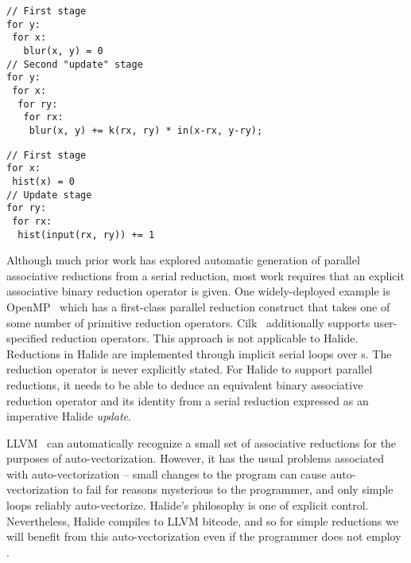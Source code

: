 \begin{lstlisting}[float, frame=t, caption={Pseudocode for convolution. This algorithm reduces over \code{rx} and \code{ry} and is data-parallel over \code{x} and \code{y}. In the Halide source, \code{rx} and \code{ry} would be \code{RVar}s in a two-dimensional \code{RDom}. \code{x} and \code{y} would be \code{Var}s.}, label={lst:blur_loopness}]
// First stage
for y:
 for x:
   blur(x, y) = 0
// Second "update" stage
for y:
 for x:
  for ry:
   for rx:
    blur(x, y) += k(rx, ry) * in(x-rx, y-ry);
\end{lstlisting}
\begin{lstlisting}[float, frame=t, caption={Computing the histogram of an image is hard to parallelize in Halide, since its update stage would be expressed with serial \code{RVar}s.}, label={lst:histogram_loopness}]
// First stage
for x:
 hist(x) = 0
// Update stage
for ry:
 for rx:
  hist(input(rx, ry)) += 1
\end{lstlisting}

Although much prior work has explored automatic generation of parallel associative reductions from a serial reduction, most work requires that an explicit associative binary reduction operator is given. One widely-deployed example is OpenMP~\cite{Dagum:1998:OIA:615255.615542} which has a first-class parallel reduction construct that takes one of some number of primitive reduction operators. Cilk~\cite{Blumofe:1995:CEM:209936.209958} additionally supports user-specified reduction operators. This approach is not applicable to Halide. Reductions in Halide are implemented through implicit serial loops over s. The reduction operator is never explicitly stated. For Halide to support parallel reductions, it needs to be able to deduce an equivalent binary associative reduction operator and its identity from a serial reduction expressed as an imperative Halide \emph{update}.

LLVM~\cite{Lattner:2004:LCF:977395.977673} can automatically recognize a small set of associative reductions for the purposes of auto-vectorization. However, it has the usual problems associated with auto-vectorization -- small changes to the program can cause auto-vectorization to fail for reasons mysterious to the programmer, and only simple loops reliably auto-vectorize. Halide's philosophy is one of explicit control. Nevertheless, Halide compiles to LLVM bitcode, and so for simple reductions we will benefit from this auto-vectorization even if the programmer does not employ .

